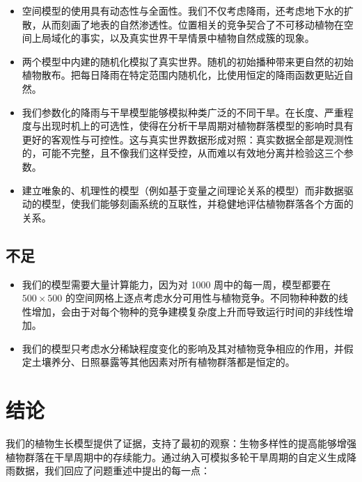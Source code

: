 \documentclass[11pt,a4paper]{ctexart}
\begin{document}
\begin{itemize}
\item 空间模型的使用具有动态性与全面性。我们不仅考虑降雨，还考虑地下水的扩散，从而刻画了地表的自然渗透性。位置相关的竞争契合了不可移动植物在空间上局域化的事实，以及真实世界干旱情景中植物自然成簇的现象。
\item 两个模型中内建的随机化模拟了真实世界。随机的初始播种带来更自然的初始植物散布。把每日降雨在特定范围内随机化，比使用恒定的降雨函数更贴近自然。
\item 我们参数化的降雨与干旱模型能够模拟种类广泛的不同干旱。在长度、严重程度与出现时机上的可选性，使得在分析干旱周期对植物群落模型的影响时具有更好的客观性与可控性。这与真实世界数据形成对照：真实数据全部是观测性的，可能不完整，且不像我们这样受控，从而难以有效地分离并检验这三个参数。
\item 建立唯象的、机理性的模型（例如基于变量之间理论关系的模型）而非数据驱动的模型，使我们能够刻画系统的互联性，并稳健地评估植物群落各个方面的关系。
\end{itemize}

\subsection{不足}

\begin{itemize}
\item 我们的模型需要大量计算能力，因为对 1000 周中的每一周，模型都要在 $500\times 500$ 的空间网格上逐点考虑水分可用性与植物竞争。不同物种种数的线性增加，会由于对每个物种的竞争建模复杂度上升而导致运行时间的非线性增加。
\item 我们的模型只考虑水分稀缺程度变化的影响及其对植物竞争相应的作用，并假定土壤养分、日照暴露等其他因素对所有植物群落都是恒定的。
\end{itemize}

\section{结论}

我们的植物生长模型提供了证据，支持了最初的观察：生物多样性的提高能够增强植物群落在干旱周期中的存续能力。通过纳入可模拟多轮干旱周期的自定义生成降雨数据，我们回应了问题重述中提出的每一点：
\end{document}
